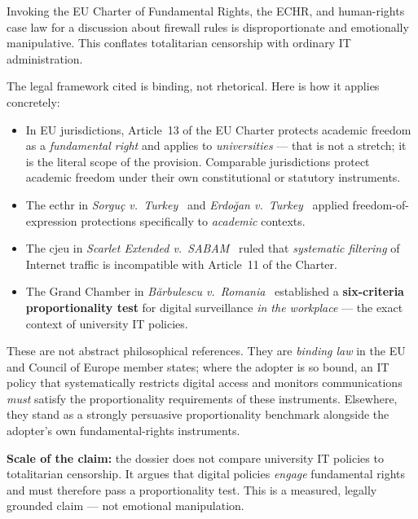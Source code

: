 \begin{clarificationbox}
Invoking the EU Charter of Fundamental Rights, the ECHR, and human-rights case law for a discussion about firewall rules is disproportionate and emotionally manipulative. This conflates totalitarian censorship with ordinary IT administration.
\end{clarificationbox}

\begin{answerbox}[Answer to Q6.3]
The legal framework cited is binding, not rhetorical. Here is how it applies concretely:
\begin{itemize}[nosep]
    \item In EU jurisdictions, Article~13 of the EU Charter protects academic freedom as a \emph{fundamental right} and applies to \emph{universities} --- that is not a stretch; it is the literal scope of the provision. Comparable jurisdictions protect academic freedom under their own constitutional or statutory instruments.
    \item The \gls{ecthr} in \emph{Sorgu\c{c} v.\ Turkey}~\cite{sorguc2009} and \emph{Erdo\u{g}an v.\ Turkey}~\cite{erdogan2014} applied freedom-of-expression protections specifically to \emph{academic} contexts.
    \item The \gls{cjeu} in \emph{Scarlet Extended v.\ SABAM}~\cite{scarlet2011} ruled that \emph{systematic filtering} of Internet traffic is incompatible with Article~11 of the Charter.
    \item The Grand Chamber in \emph{B\u{a}rbulescu v.\ Romania}~\cite{barbulescu2017} established a \textbf{six-criteria proportionality test} for digital surveillance \emph{in the workplace} --- the exact context of university IT policies.
\end{itemize}

\noindent These are not abstract philosophical references. They are \emph{binding law} in the EU and Council of Europe member states; where the adopter is so bound, an IT policy that systematically restricts digital access and monitors communications \emph{must} satisfy the proportionality requirements of these instruments. Elsewhere, they stand as a strongly persuasive proportionality benchmark alongside the adopter's own fundamental-rights instruments.

\medskip\noindent\textbf{Scale of the claim:} the dossier does not compare university IT policies to totalitarian censorship. It argues that digital policies \emph{engage} fundamental rights and must therefore pass a proportionality test. This is a measured, legally grounded claim --- not emotional manipulation.
\end{answerbox}

